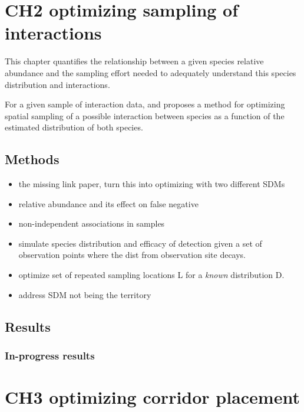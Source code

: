 \documentclass[11pt]{article}
\begin{document}
\hypertarget{ch2-optimizing-sampling-of-interactions}{%
\section{CH2 optimizing sampling of
interactions}\label{ch2-optimizing-sampling-of-interactions}}

This chapter quantifies the relationship between a given species
relative abundance and the sampling effort needed to adequately
understand this species distribution and interactions.

For a given sample of interaction data, and proposes a method for
optimizing spatial sampling of a possible interaction between species as
a function of the estimated distribution of both species.

\hypertarget{methods-1}{%
\subsection{Methods}\label{methods-1}}

\begin{itemize}
\item
  the missing link paper, turn this into optimizing with two different
  SDMs
\item
  relative abundance and its effect on false negative
\item
  non-independent associations in samples
\item
  simulate species distribution and efficacy of detection given a set of
  observation points where the dist from observation site decays.
\item
  optimize set of repeated sampling locations L for a \emph{known}
  distribution D.
\item
  address SDM not being the territory
\end{itemize}

\hypertarget{results}{%
\subsection{Results}\label{results}}

\hypertarget{in-progress-results}{%
\subsubsection{In-progress results}\label{in-progress-results}}

\hypertarget{ch3-optimizing-corridor-placement}{%
\section{CH3 optimizing corridor
placement}\label{ch3-optimizing-corridor-placement}}
\end{document}
